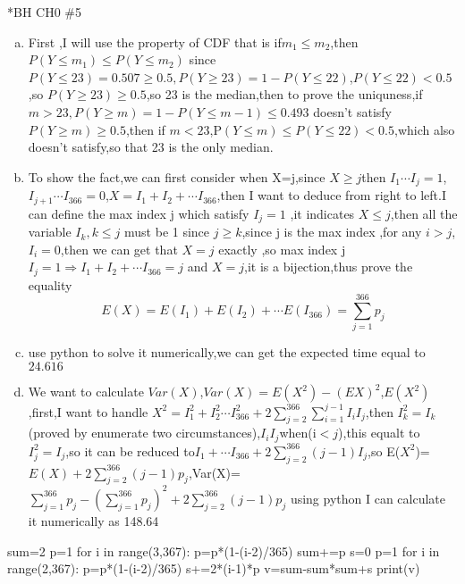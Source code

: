 \documentclass{article}
\begin{document}
\begin{homeworkProblem}*{BH CH0 \#5}
	\begin{enumerate}[(a)]
\item First ,I will use the property of CDF that is if$m_1\leq m_2$,then $P(Y\leq m_1)\leq P(Y\leq m_2)$
since$P(Y\leq 23)=0.507\geq 0.5,P(Y\geq 23)=1-P(Y\leq 22)$,$P(Y\leq 22)<0.5$,so $P(Y\geq 23)\geq 0.5$,so 23 is the median,then to prove the uniquness,if $m>23,P(Y\geq m)=1-P(Y\leq m-1)\leq 0.493$ doesn't satisfy $P(Y\geq m)\geq 0.5$,then if $m<23$,P$(Y\leq m)\leq P(Y\leq 22)<0.5$,which also doesn't satisfy,so that 23 is the only median.
\item To show the fact,we can first consider when X=j,since $X\geq j$then $I_1\cdots I_j=1$,$I_{j+1}\cdots I_{366}=0$,$X=I_1+I_2+\cdots I_{366}$,then I want to deduce from right to left.I can define the max index j which satisfy $I_j=1$ ,it indicates $X\leq j$,then all the variable $I_k,k\leq j$ must be 1 since $j\geq k$,since j is the max index ,for any $i>j$,$I_i=0$,then we can get that $X=j$ exactly ,so max index j $I_j=1\Rightarrow I_1+I_2+\cdots I_{366} =j$ and $X=j$,it is a bijection,thus prove the equality
$$E(X)=E(I_1)+E(I_2)+\cdots E(I_{366})=\sum\limits_{j=1}^{366} p_j$$
\item use python to solve it numerically,we can get the expected time equal to $24.616$
\item We want to calculate $Var(X)$,$Var(X)=E(X^2)-(EX)^2$,$E(X^2)$,first,I want to handle $X^2=I_1^2+I_2^2\cdots I_{366}^2+2\sum\limits_{j=2}^{366}\sum\limits_{i=1}^{j-1}I_iI_j$,then $I_k^2=I_k$(proved by enumerate two circumstances),$I_iI_j$when(i$<j$),this equalt to $I_j^2=I_j$,so it can be reduced to$I_1+\cdots I_{366}+2\sum\limits_{j=2}^{366}(j-1)I_j$,so E($X^2$)=$E(X)+2\sum\limits_{j=2}^{366}(j-1)p_j$,Var(X)=$\sum\limits_{j=1}^{366}p_j-(\sum\limits_{j=1}^{366}p_j)^2+2\sum\limits_{j=2}^{366}(j-1)p_j$ using python I can calculate it numerically as 148.64

\end{enumerate}
\begin{python}
sum=2
p=1
for  i in range(3,367):
 p=p*(1-(i-2)/365)
 sum+=p
s=0 
p=1
for i in range(2,367):
    p=p*(1-(i-2)/365)
    s+=2*(i-1)*p
v=sum-sum*sum+s
print(v)
\end{python}
\end{homeworkProblem}
\end{document}
